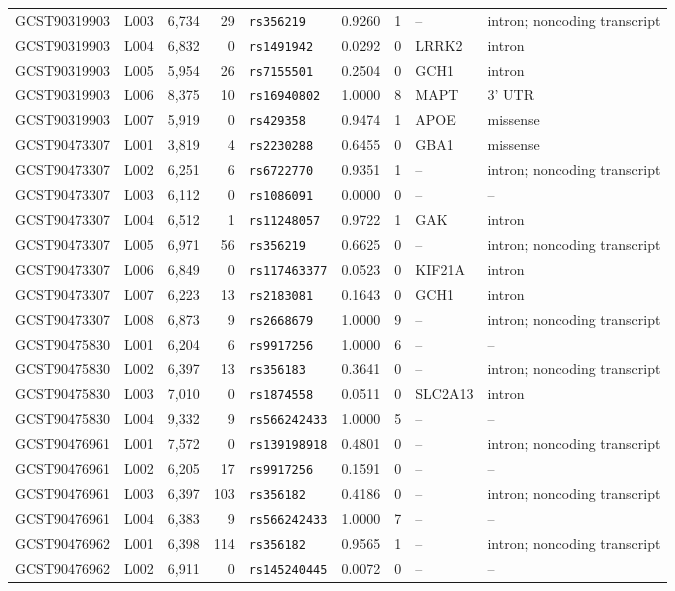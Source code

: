 \documentclass[11pt,a4paper]{article}
\begin{document}
\begin{landscape}
\begin{longtable}{@{}llrrllrlp{4.0cm}@{}}
GCST90319903 & L003 & 6,734 & 29 & \texttt{rs356219} & 0.9260 & 1 & -- & intron; noncoding transcript \\
GCST90319903 & L004 & 6,832 & 0 & \texttt{rs1491942} & 0.0292 & 0 & LRRK2 & intron \\
GCST90319903 & L005 & 5,954 & 26 & \texttt{rs7155501} & 0.2504 & 0 & GCH1 & intron \\
GCST90319903 & L006 & 8,375 & 10 & \texttt{rs16940802} & 1.0000 & 8 & MAPT & 3' UTR \\
GCST90319903 & L007 & 5,919 & 0 & \texttt{rs429358} & 0.9474 & 1 & APOE & missense \\
GCST90473307 & L001 & 3,819 & 4 & \texttt{rs2230288} & 0.6455 & 0 & GBA1 & missense \\
GCST90473307 & L002 & 6,251 & 6 & \texttt{rs6722770} & 0.9351 & 1 & -- & intron; noncoding transcript \\
GCST90473307 & L003 & 6,112 & 0 & \texttt{rs1086091} & 0.0000 & 0 & -- & -- \\
GCST90473307 & L004 & 6,512 & 1 & \texttt{rs11248057} & 0.9722 & 1 & GAK & intron \\
GCST90473307 & L005 & 6,971 & 56 & \texttt{rs356219} & 0.6625 & 0 & -- & intron; noncoding transcript \\
GCST90473307 & L006 & 6,849 & 0 & \texttt{rs117463377} & 0.0523 & 0 & KIF21A & intron \\
GCST90473307 & L007 & 6,223 & 13 & \texttt{rs2183081} & 0.1643 & 0 & GCH1 & intron \\
GCST90473307 & L008 & 6,873 & 9 & \texttt{rs2668679} & 1.0000 & 9 & -- & intron; noncoding transcript \\
GCST90475830 & L001 & 6,204 & 6 & \texttt{rs9917256} & 1.0000 & 6 & -- & -- \\
GCST90475830 & L002 & 6,397 & 13 & \texttt{rs356183} & 0.3641 & 0 & -- & intron; noncoding transcript \\
GCST90475830 & L003 & 7,010 & 0 & \texttt{rs1874558} & 0.0511 & 0 & SLC2A13 & intron \\
GCST90475830 & L004 & 9,332 & 9 & \texttt{rs566242433} & 1.0000 & 5 & -- & -- \\
GCST90476961 & L001 & 7,572 & 0 & \texttt{rs139198918} & 0.4801 & 0 & -- & intron; noncoding transcript \\
GCST90476961 & L002 & 6,205 & 17 & \texttt{rs9917256} & 0.1591 & 0 & -- & -- \\
GCST90476961 & L003 & 6,397 & 103 & \texttt{rs356182} & 0.4186 & 0 & -- & intron; noncoding transcript \\
GCST90476961 & L004 & 6,383 & 9 & \texttt{rs566242433} & 1.0000 & 7 & -- & -- \\
GCST90476962 & L001 & 6,398 & 114 & \texttt{rs356182} & 0.9565 & 1 & -- & intron; noncoding transcript \\
GCST90476962 & L002 & 6,911 & 0 & \texttt{rs145240445} & 0.0072 & 0 & -- & -- \\
\end{longtable}
\endgroup
\end{landscape}
\end{document}
